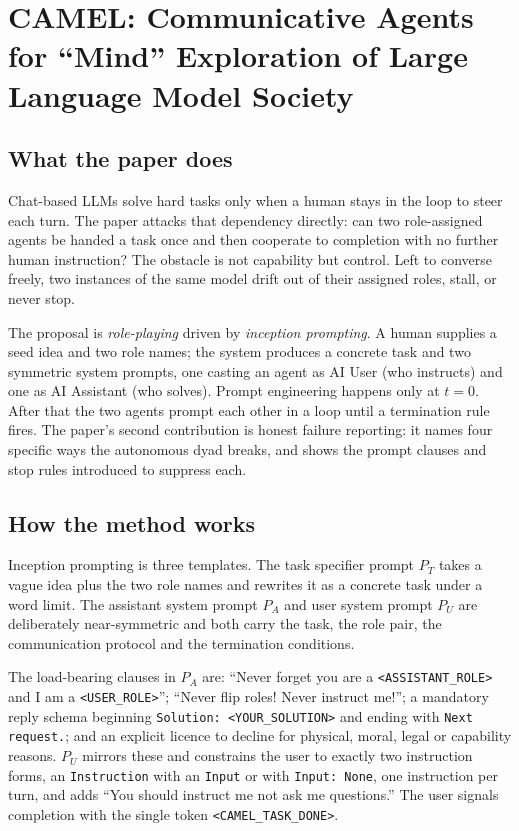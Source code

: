 \section{CAMEL: Communicative Agents for ``Mind'' Exploration of Large Language Model Society}

\subsection{What the paper does}

Chat-based LLMs solve hard tasks only when a human stays in the loop to steer each turn. The paper attacks that dependency directly: can two role-assigned agents be handed a task once and then cooperate to completion with no further human instruction? The obstacle is not capability but control. Left to converse freely, two instances of the same model drift out of their assigned roles, stall, or never stop.

The proposal is \emph{role-playing} driven by \emph{inception prompting}. A human supplies a seed idea and two role names; the system produces a concrete task and two symmetric system prompts, one casting an agent as AI User (who instructs) and one as AI Assistant (who solves). Prompt engineering happens only at $t=0$. After that the two agents prompt each other in a loop until a termination rule fires. The paper's second contribution is honest failure reporting: it names four specific ways the autonomous dyad breaks, and shows the prompt clauses and stop rules introduced to suppress each.

\subsection{How the method works}

Inception prompting is three templates. The task specifier prompt $P_T$ takes a vague idea plus the two role names and rewrites it as a concrete task under a word limit. The assistant system prompt $P_A$ and user system prompt $P_U$ are deliberately near-symmetric and both carry the task, the role pair, the communication protocol and the termination conditions.

The load-bearing clauses in $P_A$ are: ``Never forget you are a \texttt{<ASSISTANT\_ROLE>} and I am a \texttt{<USER\_ROLE>}''; ``Never flip roles! Never instruct me!''; a mandatory reply schema beginning \texttt{Solution: <YOUR\_SOLUTION>} and ending with \texttt{Next request.}; and an explicit licence to decline for physical, moral, legal or capability reasons. $P_U$ mirrors these and constrains the user to exactly two instruction forms, an \texttt{Instruction} with an \texttt{Input} or with \texttt{Input: None}, one instruction per turn, and adds ``You should instruct me not ask me questions.'' The user signals completion with the single token \texttt{<CAMEL\_TASK\_DONE>}.

